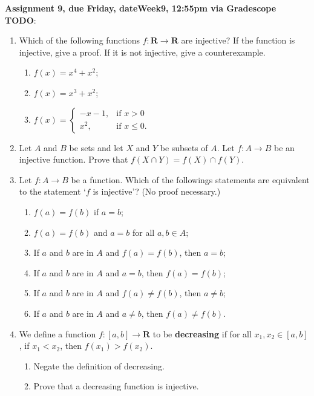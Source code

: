 \documentclass[12pt]{article}
\newcommand{\HWdueTime}{12:55pm }
\begin{document}
\noindent \textbf{Assignment 9, due Friday, \csname dateWeek9\endcsname, \HWdueTime via Gradescope TODO}:
\begin{enumerate}
\item Which of the following functions $f \colon \mathbf{R}\to \mathbf{R}$ are injective? If the function is injective, give a proof. If it is not injective, give a counterexample.
 \begin{enumerate}
 \item $f(x) = x^4 + x^2$;
 \item $f(x) = x^3 + x^2$;
 \item $f(x) =
 \begin{cases}
 -x-1, & \text{if $x > 0$} \\
 x^2, & \text{if $x \leq 0$}.
 \end{cases}
 $ 
 \end{enumerate}
\item Let $A$ and $B$ be sets and let $X$ and $Y$ be subsets of $A$. Let $f \colon A \to B$ be an injective function. Prove that $f(X \cap Y) = f(X) \cap f(Y)$.
\item Let $f \colon A \to B$ be a function. Which of the followings statements are equivalent to the statement `$f$ is injective'? (No proof necessary.)
 \begin{enumerate}
 \item $f(a) = f(b)$ if $a = b$;
 \item $f(a) = f(b)$ and $a = b$ for all $a,b \in A$;
 \item If $a$ and $b$ are in $A$ and $f(a) = f(b)$, then $a = b$;
 \item If $a$ and $b$ are in $A$ and $a = b$, then $f(a) = f(b)$;
 \item If $a$ and $b$ are in $A$ and $f(a) \neq f(b)$, then $a \neq b$;
 \item If $a$ and $b$ are in $A$ and $a \neq b$, then $f(a) \neq f(b)$. 
 \end{enumerate}
\item We define a function $f\colon [a,b] \to \mathbf{R}$ to be \textbf{decreasing} if for all $x_1,x_2 \in [a,b]$, if $x_1 < x_2$, then $f(x_1) > f(x_2)$.
 \begin{enumerate}
 \item Negate the definition of decreasing.
 \item Prove that a decreasing function is injective.
 \end{enumerate}
\end{enumerate}
\end{document}
